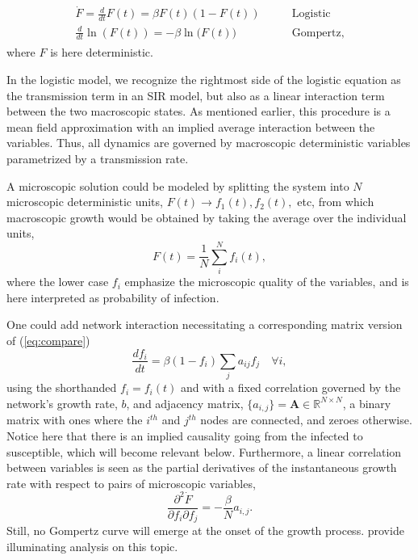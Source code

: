 \documentclass{article}
\begin{document}
\begin{align}
\label{eq:compare}
\begin{split}
\dot{F} = \frac{d}{dt}F(t) = \beta F(t) (1-F(t)) \quad&\quad \text{Logistic}\\ 
\frac{d}{dt}\ln{(F(t))} = -\beta \ln{(F(t)}) &\quad \text{Gompertz},
\end{split}
\end{align}
where $F$ is here deterministic. 

In the logistic model, we recognize the rightmost side of the logistic equation as the transmission term in an SIR model, but also as a linear interaction term between the two macroscopic states. 
As mentioned earlier, this procedure is a mean field approximation with an implied average interaction between the variables. 
Thus, all dynamics are governed by macroscopic deterministic variables parametrized by a transmission rate.

A microscopic solution could be modeled by splitting the system into $N$ microscopic deterministic units, $F(t) \rightarrow f_1(t), f_2(t),$ etc, from which macroscopic growth would be obtained by taking the average over the individual units,
\begin{equation}
F(t) = \frac{1}{N}\sum_i^N f_i(t),
\end{equation}
where the lower case $f_i$ emphasize the microscopic quality of the variables, and is here interpreted as probability of infection.

One could add network interaction necessitating a corresponding matrix version of (\ref{eq:compare})
\begin{equation}
\label{eq:networkSIR}
\frac{d f_i}{dt} = \beta (1-f_i)\sum_j{a_{ij}}f_j \quad \forall i,
\end{equation}
using the shorthanded $f_i=f_i(t)$ and with a fixed correlation governed by the network's growth rate, $b$, and adjacency matrix, $\{a_{i,j}\}=\mathbf{A} \in \mathbb{R}^{N \times N}$, a binary matrix with ones where the $i^{th}$ and $j^{th}$ nodes are connected, and zeroes otherwise. Notice here that there is an implied causality going from the infected to susceptible, which will become relevant below. Furthermore, a linear correlation between variables is seen as the partial derivatives of the instantaneous growth rate with respect to pairs of microscopic variables,
\begin{equation}
\frac{\partial^2 \dot{F}}{\partial f_i \partial f_j} = -\frac{\beta}{N} a_{i,j}.
\end{equation}
Still, no Gompertz curve will emerge at the onset of the growth process. \citet{estrada2022networked} provide illuminating analysis on this topic.
\end{document}
